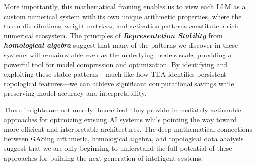 More importantly, this mathematical framing enables us to view each LLM as a custom numerical system with its own unique arithmetic properties, where the token distributions, weight matrices, and activation patterns constitute a rich numerical ecosystem. The principles of \textbf{\textit{Representation Stability}} from \textbf{\textit{homological algebra}} suggest that many of the patterns we discover in these systems will remain stable even as the underlying models scale, providing a powerful tool for model compression and optimization. By identifying and exploiting these stable patterns—much like how TDA identifies persistent topological features—we can achieve significant computational savings while preserving model accuracy and interpretability.

These insights are not merely theoretical: they provide immediately actionable approaches for optimizing existing AI systems while pointing the way toward more efficient and interpretable architectures. The deep mathematical connections between GASing arithmetic, homological algebra, and topological data analysis suggest that we are only beginning to understand the full potential of these approaches for building the next generation of intelligent systems.
